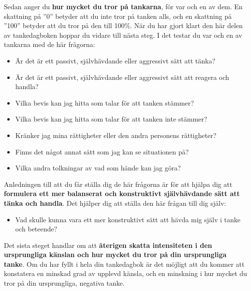 \documentclass[swedish,a4paper]{book}
\begin{document}
Sedan anger du \textbf{hur mycket du tror på tankarna}, för var och en av dem. En skattning på ''0'' betyder att du inte tror på tanken alls, och en skattning på ''100'' betyder att du tror på den till 100\%. När du har gjort klart den här delen av tankedagboken hoppar du vidare till nästa steg. I det testar du var och en av tankarna med de här frågorna:

\begin{itemize}

\item Är det är ett passivt, självhävdande eller aggressivt sätt att tänka?

\item Är det är ett passivt, självhävdande eller aggressivt sätt att reagera och handla?

\item Vilka bevis kan jag hitta som talar för att tanken stämmer?

\item Vilka bevis kan jag hitta som talar för att tanken inte stämmer?

\item Kränker jag mina rättigheter eller den andra personens rättigheter?

\item Finns det något annat sätt som jag kan se situationen på?

\item Vilka andra tolkningar av vad som hände kan jag göra?

\end{itemize}

Anledningen till att du får ställa dig de här frågorna är för att hjälpa dig att \textbf{formulera ett mer balanserat och konstruktivt självhävdande sätt att tänka och handla}. Det hjälper dig att ställa den här frågan till dig själv:

\begin{itemize}

\item Vad skulle kunna vara ett mer konstruktivt sätt att hävda mig själv i tanke och beteende?

\end{itemize}

Det sista steget handlar om att \textbf{återigen skatta intensiteten i den ursprungliga känslan och hur mycket du tror på din ursprungliga tanke}. Om du har fyllt i hela din tankedagbok är det möjligt att du kommer att konstatera en minskad grad av upplevd känsla, och en minskning i hur mycket du tror på din ursprungliga, negativa tanke. 
\end{document}
